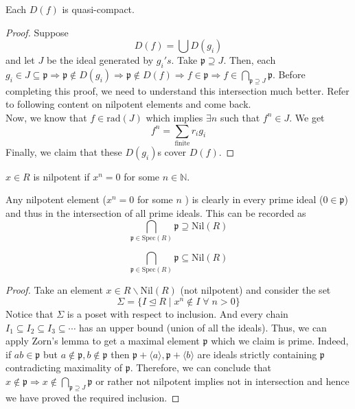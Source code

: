 \documentclass[oneside, 12pt, ]{scrbook}
\newcommand{\NN}{\mathbb N}
\newcommand{\spec}{\mathrm{Spec}}
\newcommand{\pr}{\mathfrak{p}}
\newcommand{\nil}{\mathrm{Nil}}
\theoremstyle{theorem}
\begin{document}
\begin{proposition}
Each $D(f)$ is quasi-compact.
\end{proposition}

\begin{proof}
Suppose $$D(f) = \bigcup D(g_{i})$$ and let $J$ be the ideal generated by $g_{i}'s$. Take $\mathfrak{p} \supseteq J$. Then, each $g_{i} \in J \subseteq \mathfrak{p} \Rightarrow \mathfrak{p} \not \in D(g_{i}) \Rightarrow \mathfrak{p} \not \in D(f) \Rightarrow f \in \mathfrak{p} \Rightarrow f \in \bigcap_{\mathfrak{p} \supseteq J} \mathfrak{p}$. \textcolor{BrickRed}{Before completing this proof, we need to understand this intersection much better. Refer to following content on nilpotent elements and come back.}\\
Now, we know that $f \in \mathrm{rad}(J)$ which implies $\exists n$ such that $f^n \in J$. We get $$f^n = \sum_{\text{finite}} r_{i}g_{i}$$ Finally, we claim that these $D(g_{i})$s cover $D(f)$. 
\end{proof}

\begin{definition}
$x\in R$ is nilpotent if $x^n =0$ for some $n \in \NN$.
\end{definition}

\begin{remark}
Any nilpotent element ($x^n = 0$ for some $n$ ) is clearly in every prime ideal ($0 \in \mathfrak{p}$) and thus in the intersection of all prime ideals. This can be recorded as $$\bigcap_{\pr \in \spec(R)} \pr \supseteq \nil(R)$$
\end{remark}

\begin{proposition}
$$\bigcap_{\pr \in \spec(R)} \pr \subseteq \nil(R)$$
\end{proposition}

\begin{proof}
Take an element $x \in R \backslash \nil(R)$ (not nilpotent) and consider the set $$\Sigma = \{ I \unlhd R \mid x^n \not \in I \; \forall \; n >0\}$$
Notice that $\Sigma$ is a poset with respect to inclusion. And every chain $I_{1} \subseteq I_{2} \subseteq I_{3} \subseteq \cdots $ has an upper bound (union of all the ideals). Thus, we can apply Zorn's lemma to get a maximal element $\pr$ which we claim is prime. Indeed, if $ab \in \pr$ but $a\not \in \pr, b \not \in \pr$ then $\pr + \langle a \rangle, \pr + \langle b \rangle$ are ideals strictly containing $\pr$ contradicting maximality of $\pr$. Therefore, we can conclude that $x \not \in \pr \Rightarrow x \not \in \bigcap_{\pr \supseteq J} \pr$ or rather not nilpotent implies not in intersection and hence we have proved the required inclusion. 
\end{proof}
\end{document}
